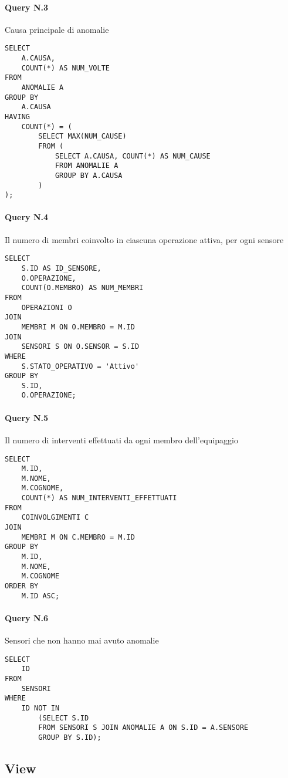 \paragraph{Query N.3}Causa principale di anomalie
\begin{lstlisting}
SELECT 
    A.CAUSA, 
    COUNT(*) AS NUM_VOLTE
FROM 
    ANOMALIE A
GROUP BY 
    A.CAUSA
HAVING 
    COUNT(*) = (
        SELECT MAX(NUM_CAUSE)
        FROM (
            SELECT A.CAUSA, COUNT(*) AS NUM_CAUSE
            FROM ANOMALIE A
            GROUP BY A.CAUSA
        ) 
);
\end{lstlisting}

\paragraph{Query N.4} Il numero di membri coinvolto in ciascuna operazione attiva, per ogni sensore
\begin{lstlisting}
SELECT 
    S.ID AS ID_SENSORE, 
    O.OPERAZIONE, 
    COUNT(O.MEMBRO) AS NUM_MEMBRI
FROM 
    OPERAZIONI O
JOIN 
    MEMBRI M ON O.MEMBRO = M.ID
JOIN 
    SENSORI S ON O.SENSOR = S.ID
WHERE 
    S.STATO_OPERATIVO = 'Attivo'
GROUP BY 
    S.ID, 
    O.OPERAZIONE;
\end{lstlisting}

\paragraph{Query N.5} Il numero di interventi effettuati da ogni membro dell'equipaggio
\begin{lstlisting}
SELECT 
    M.ID, 
    M.NOME, 
    M.COGNOME, 
    COUNT(*) AS NUM_INTERVENTI_EFFETTUATI
FROM 
    COINVOLGIMENTI C
JOIN 
    MEMBRI M ON C.MEMBRO = M.ID
GROUP BY 
    M.ID, 
    M.NOME, 
    M.COGNOME
ORDER BY 
    M.ID ASC;
\end{lstlisting}

\paragraph{Query N.6} Sensori che non hanno mai avuto anomalie
\begin{lstlisting}
SELECT 
    ID
FROM 
    SENSORI
WHERE 
    ID NOT IN
        (SELECT S.ID 
        FROM SENSORI S JOIN ANOMALIE A ON S.ID = A.SENSORE
        GROUP BY S.ID);
\end{lstlisting}

\subsection{View}
